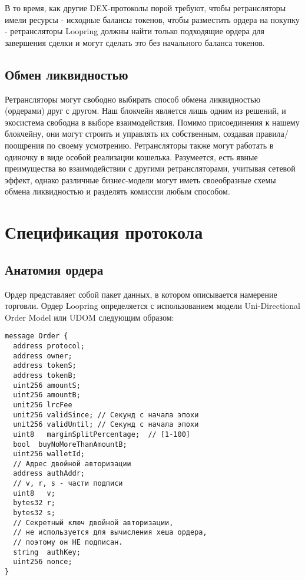 \documentclass[utf8,nofonts]{article}
\begin{document}
\begin{multicols}{2}
	
	В то время, как другие DEX-протоколы порой требуют, чтобы ретрансляторы имели ресурсы - исходные балансы токенов, чтобы разместить ордера на покупку - ретрансляторы Loopring должны найти только подходящие ордера для завершения сделки и могут сделать это без начального баланса токенов.
	
	\subsection{Обмен ликвидностью\label{sec:liquidity_sharing}}
	Ретрансляторы могут свободно выбирать способ обмена ликвидностью (ордерами) друг с другом. Наш блокчейн является лишь одним из решений, и экосистема свободна в выборе взаимодействия. Помимо присоединения к нашему блокчейну, они могут строить и управлять их собственным, создавая правила/поощрения по своему усмотрению. Ретрансляторы также могут работать в одиночку в виде особой реализации кошелька. Разумеется, есть явные преимущества во взаимодействии с другими ретрансляторами, учитывая сетевой эффект, однако различные бизнес-модели могут иметь своеобразные схемы обмена ликвидностью и разделять комиссии любым способом.
	
	
	\section{Спецификация протокола\label{sec:protocol}}
	
	\subsection{Анатомия ордера\label{anatomy}}
	Ордер представляет собой пакет данных, в котором описывается намерение торговли. Ордер Loopring определяется с использованием модели Uni-Directional Order Model или UDOM следующим образом:
	
	\begin{verbatim}
message Order {
  address protocol;
  address owner;
  address tokenS;
  address tokenB;
  uint256 amountS;
  uint256 amountB;
  unit256 lrcFee
  unit256 validSince; // Секунд с начала эпохи
  unit256 validUntil; // Секунд с начала эпохи
  uint8   marginSplitPercentage;  // [1-100]
  bool  buyNoMoreThanAmountB;
  uint256 walletId;
  // Адрес двойной авторизации
  address authAddr;
  // v, r, s - части подписи
  uint8   v;     
  bytes32 r;
  bytes32 s;
  // Секретный ключ двойной авторизации,
  // не используется для вычисления хеша ордера,
  // поэтому он НЕ подписан.
  string  authKey;
  uint256 nonce;      
}
	\end{verbatim}
	

\end{multicols}
\end{document}
